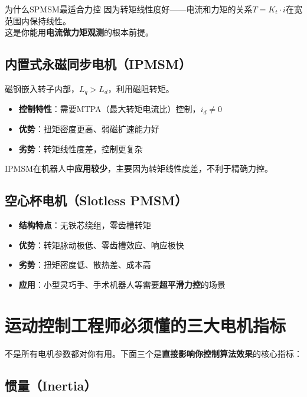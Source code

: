 \begin{engineeringbox}{为什么SPMSM最适合力控}
因为转矩线性度好——电流和力矩的关系$T = K_t \cdot i$在宽范围内保持线性。\\
这是你能用\textbf{电流做力矩观测}的根本前提。
\end{engineeringbox}

\subsection{内置式永磁同步电机（IPMSM）}

磁钢嵌入转子内部，$L_q > L_d$，利用磁阻转矩。

\begin{itemize}
  \item \textbf{控制特性}：需要MTPA（最大转矩电流比）控制，$i_d \neq 0$
  \item \textbf{优势}：扭矩密度更高、弱磁扩速能力好
  \item \textbf{劣势}：转矩线性度差，控制更复杂
\end{itemize}

IPMSM在机器人中\textbf{应用较少}，主要因为转矩线性度差，不利于精确力控。

\subsection{空心杯电机（Slotless PMSM）}

\begin{itemize}
  \item \textbf{结构特点}：无铁芯绕组，零齿槽转矩
  \item \textbf{优势}：转矩脉动极低、零齿槽效应、响应极快
  \item \textbf{劣势}：扭矩密度低、散热差、成本高
  \item \textbf{应用}：小型灵巧手、手术机器人等需要\textbf{超平滑力控}的场景
\end{itemize}

\section{运动控制工程师必须懂的三大电机指标}

不是所有电机参数都对你有用。下面三个是\textbf{直接影响你控制算法效果}的核心指标：

\subsection{惯量（Inertia）}

